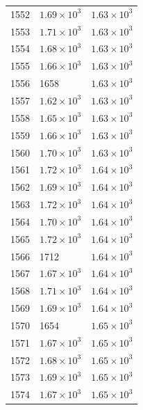 \begin{table}[H]
\begin{tabular}{lll}
1552 & $\displaystyle 1.69 \times 10^{3}$ & $\displaystyle 1.63 \times 10^{3}$ \\
1553 & $\displaystyle 1.71 \times 10^{3}$ & $\displaystyle 1.63 \times 10^{3}$ \\
1554 & $\displaystyle 1.68 \times 10^{3}$ & $\displaystyle 1.63 \times 10^{3}$ \\
1555 & $\displaystyle 1.66 \times 10^{3}$ & $\displaystyle 1.63 \times 10^{3}$ \\
1556 & 1658 & $\displaystyle 1.63 \times 10^{3}$ \\
1557 & $\displaystyle 1.62 \times 10^{3}$ & $\displaystyle 1.63 \times 10^{3}$ \\
1558 & $\displaystyle 1.65 \times 10^{3}$ & $\displaystyle 1.63 \times 10^{3}$ \\
1559 & $\displaystyle 1.66 \times 10^{3}$ & $\displaystyle 1.63 \times 10^{3}$ \\
1560 & $\displaystyle 1.70 \times 10^{3}$ & $\displaystyle 1.63 \times 10^{3}$ \\
1561 & $\displaystyle 1.72 \times 10^{3}$ & $\displaystyle 1.64 \times 10^{3}$ \\
1562 & $\displaystyle 1.69 \times 10^{3}$ & $\displaystyle 1.64 \times 10^{3}$ \\
1563 & $\displaystyle 1.72 \times 10^{3}$ & $\displaystyle 1.64 \times 10^{3}$ \\
1564 & $\displaystyle 1.70 \times 10^{3}$ & $\displaystyle 1.64 \times 10^{3}$ \\
1565 & $\displaystyle 1.72 \times 10^{3}$ & $\displaystyle 1.64 \times 10^{3}$ \\
1566 & 1712 & $\displaystyle 1.64 \times 10^{3}$ \\
1567 & $\displaystyle 1.67 \times 10^{3}$ & $\displaystyle 1.64 \times 10^{3}$ \\
1568 & $\displaystyle 1.71 \times 10^{3}$ & $\displaystyle 1.64 \times 10^{3}$ \\
1569 & $\displaystyle 1.69 \times 10^{3}$ & $\displaystyle 1.64 \times 10^{3}$ \\
1570 & 1654 & $\displaystyle 1.65 \times 10^{3}$ \\
1571 & $\displaystyle 1.67 \times 10^{3}$ & $\displaystyle 1.65 \times 10^{3}$ \\
1572 & $\displaystyle 1.68 \times 10^{3}$ & $\displaystyle 1.65 \times 10^{3}$ \\
1573 & $\displaystyle 1.69 \times 10^{3}$ & $\displaystyle 1.65 \times 10^{3}$ \\
1574 & $\displaystyle 1.67 \times 10^{3}$ & $\displaystyle 1.65 \times 10^{3}$ \\

\end{tabular}
\end{table}
